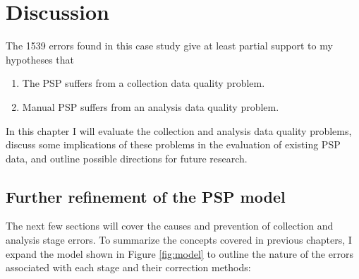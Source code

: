 
\chapter{Discussion} 

The 1539 errors found in this case study give at least partial support to
my hypotheses that
\begin{enumerate}
\item The PSP suffers from a collection data quality problem.
\item Manual PSP suffers from an analysis data quality problem.
\end{enumerate}
In this chapter I will evaluate the collection and analysis data quality
problems, discuss some implications of these problems in the evaluation of
existing PSP data, and outline possible directions for future research.


\section{Further refinement of the PSP model} 

The next few sections will cover the causes and prevention of collection
and analysis stage errors.  To summarize the concepts covered in previous
chapters, I expand the model shown in Figure \ref{fig:model} to outline the
nature of the errors associated with each stage and their correction
methods:



